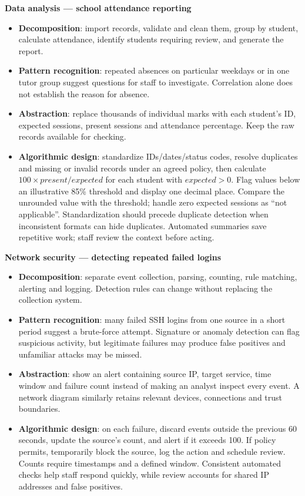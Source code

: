 \documentclass[a4paper,12pt]{article}
\begin{document}
\textbf{Data analysis --- school attendance reporting}
\begin{itemize}
    \item \textbf{Decomposition}: import records, validate and clean them, group by student, calculate attendance, identify students requiring review, and generate the report.
    \item \textbf{Pattern recognition}: repeated absences on particular weekdays or in one tutor group suggest questions for staff to investigate. Correlation alone does not establish the reason for absence.
    \item \textbf{Abstraction}: replace thousands of individual marks with each student's ID, expected sessions, present sessions and attendance percentage. Keep the raw records available for checking.
    \item \textbf{Algorithmic design}: standardize IDs/dates/status codes, resolve duplicates and missing or invalid records under an agreed policy, then calculate $100 \times present/expected$ for each student with $expected>0$. Flag values below an illustrative 85\% threshold and display one decimal place. Compare the unrounded value with the threshold; handle zero expected sessions as ``not applicable''. Standardization should precede duplicate detection when inconsistent formats can hide duplicates. Automated summaries save repetitive work; staff review the context before acting.
\end{itemize}

\textbf{Network security --- detecting repeated failed logins}
\begin{itemize}
    \item \textbf{Decomposition}: separate event collection, parsing, counting, rule matching, alerting and logging. Detection rules can change without replacing the collection system.
    \item \textbf{Pattern recognition}: many failed SSH logins from one source in a short period suggest a brute-force attempt. Signature or anomaly detection can flag suspicious activity, but legitimate failures may produce false positives and unfamiliar attacks may be missed.
    \item \textbf{Abstraction}: show an alert containing source IP, target service, time window and failure count instead of making an analyst inspect every event. A network diagram similarly retains relevant devices, connections and trust boundaries.
    \item \textbf{Algorithmic design}: on each failure, discard events outside the previous 60 seconds, update the source's count, and alert if it exceeds 100. If policy permits, temporarily block the source, log the action and schedule review. Counts require timestamps and a defined window. Consistent automated checks help staff respond quickly, while review accounts for shared IP addresses and false positives.
\end{itemize}
\end{document}

